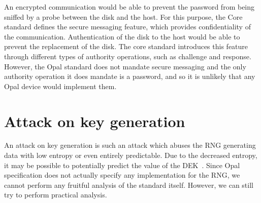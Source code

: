 An encrypted communication would be able to prevent the password from being sniffed by a probe between the disk and the host. For this purpose, the Core standard defines the secure messaging feature, which provides confidentiality of the communication.
Authentication of the disk to the host would be able to prevent the replacement of the disk. 
The core standard introduces this feature through different types of authority operations, such as challenge and response.
However, the Opal standard does not mandate secure messaging and the only authority operation it does mandate is a password, and so it is unlikely that any Opal device would implement them.










\section{Attack on key generation}
\label{attack_rng}

An attack on key generation is such an attack which abuses the RNG generating data with low entropy or even entirely predictable. Due to the decreased entropy, it may be possible to potentially predict the value of the DEK~\cite{self_encrypting_deception}.
Since Opal specification does not actually specify any implementation for the RNG, we cannot perform any fruitful analysis of the standard itself. However, we can still try to perform practical analysis.



